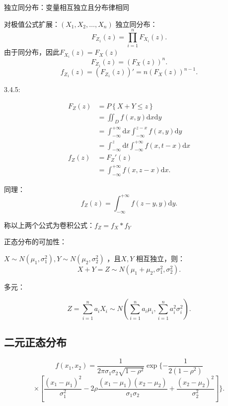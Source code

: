 \begin{notation}
    独立同分布：变量相互独立且分布律相同
\end{notation}
对极值公式扩展：$\left( X_1,X_2,\ldots,X_n \right) $ 独立同分布：
\[
    F_{Z_1}\left( z \right)=\prod_{i=1}^{n} F_{X_i}\left( z \right)  
.\] 
由于同分布，因此$F_{X_i}\left( z \right) =F_{X}\left( z \right) $
\[
    F_{Z_1}\left( z \right)=(F_{X}\left( z \right) ) ^{n}
.\] 
\[
    f_{Z_1}\left( z \right) =\left( F_{Z_1}\left( z \right)  \right) '=n\left( F_{X}\left( z \right)  \right) ^{n-1}
.\] 
\begin{notation}
    3.4.5:

    \begin{align*}
        F_Z\left( z \right) &=P\left\{ X+Y\le z \right\} \\
        &= \iint_D f\left( x,y \right) \mathrm{d}x\mathrm{d}y \\
        &= \int_{-\infty}^{+\infty} \mathrm{d}x\int_{-\infty}^{z-x} f\left( x,y \right)  \mathrm{d}y \\
        &= \int_{-\infty}^{z} \mathrm{d}t \int_{-\infty}^{+\infty} f\left( x,t-x \right)   \mathrm{d}x \\
        f_Z\left( z \right) &= F_Z'\left( z \right)  \\
        &= \int_{-\infty}^{+\infty} f\left( x,z-x \right)  \mathrm{d}x
    .\end{align*}
\end{notation}
同理：\[
    f_Z\left( z \right) =\int_{-\infty}^{+\infty} f\left( z-y,y \right)  \mathrm{d}y
.\] 

称以上两个公式为卷积公式：$f_Z=f_X*f_Y$
\begin{notation}
    正态分布的可加性：

    $X\sim N\left( \mu_1,\sigma_1^2 \right) ,Y\sim N\left( \mu_2,\sigma_2^2 \right) $ ，且$X,Y$ 相互独立，则：\[
        X+Y=Z\sim N\left( \mu_1+\mu_2,\sigma_1^2,\sigma_2^2 \right) 
    .\] 

    多元：

    \[
        Z=\sum_{i=1}^{n} a_iX_i\sim N\left( \sum_{i=1}^{n} a_i\mu_i,\sum_{i=1}^{n} a_i^2\sigma_i^2 \right) 
    .\] 
\end{notation}
\subsection{二元正态分布}%
\label{sub:二元正态分布}
\[
    f( x_1,x_2 ) =\frac{1}{2\pi\sigma_1\sigma_2\sqrt{1-\rho^2} }\exp\{-\frac{1}{2( 1-\rho^2 )}
\] 
\[
     \times \left[ \frac{(x_1-\mu_1)^2}{\sigma_1^2}-2\rho \frac{( x_1-\mu_1 ) ( x_2-\mu_2 ) }{\sigma_1\sigma_2} +\frac{(x_2-\mu_2)^2}{\sigma_2^2}\right]\}
.\] 

